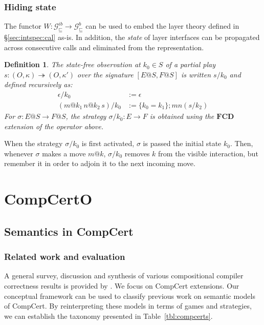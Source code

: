 \documentclass[draft,11pt]{report}
\newtheorem{definition}{Definition}
\newcommand{\gcat}{\mathcal{G}_{\sqsubseteq}}
\begin{document}
\section{Hiding state} \label{sec:gamesem:pack} %

The functor
$W : \gcat^{ib} \rightarrow \gcat^b$
can be used to embed the layer theory
defined in \S\ref{sec:intspec:cal} as-is.
In addition, the \emph{state} of layer interfaces
can be propagated across consecutive calls and
eliminated from the representation.

\begin{definition}
The \emph{state-free observation} at $k_0 \in S$
of a partial play
$s : (O, \kappa) \twoheadrightarrow (O, \kappa')$
over the signature $[E@S, F@S]$
is written $s/k_0$ and defined recursively as:
\begin{align*}
    \epsilon / k_0 &:= \epsilon \\
    (m@k_1 \, n@k_2 \, s) / k_0 &:=
      \{ k_0 = k_1 \} ; m n (s / k_2)
\end{align*}
For $\sigma : E@S \rightarrow F@S$,
the strategy $\sigma / k_0 : E \rightarrow F$
is obtained using the $\mathbf{FCD}$ extension
of the operator above.
\end{definition}

When the strategy $\sigma / k_0$ is first activated,
$\sigma$ is passed the initial state $k_0$.
Then, whenever $\sigma$ makes a move $m@k$,
$\sigma / k_0$ removes $k$ from the visible interaction,
but remember it in order to adjoin it to the next incoming move.



\part{CompCertO}

\chapter{Semantics in CompCert} %

\section{Related work and evaluation} \label{sec:rw} %

A general survey,
discussion and synthesis of various
compositional compiler correctness results
is provided by \citet{next700}.
We focus on CompCert extensions.
Our conceptual framework
can be used to classify previous work
on semantic models of CompCert.
By reinterpreting these models
in terms of games and strategies,
we can establish the taxonomy presented in
Table~\ref{tbl:compcerts}.
\end{document}

